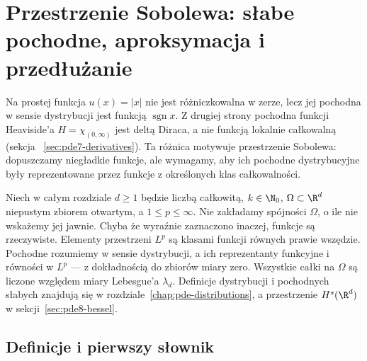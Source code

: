 \chapter[Przestrzenie Sobolewa]{Przestrzenie Sobolewa: słabe pochodne, aproksymacja i przedłużanie}
\label{chap:pde-sobolev}

Na prostej funkcja $u(x)=|x|$ nie jest różniczkowalna w zerze,
lecz jej pochodna w sensie dystrybucji jest funkcją
$\operatorname{sgn}x$. Z drugiej strony pochodna funkcji
Heaviside'a $H=\chi_{(0,\infty)}$ jest deltą Diraca,
a nie funkcją lokalnie całkowalną (sekcja
~\ref{sec:pde7-derivatives}). Ta różnica motywuje przestrzenie Sobolewa: dopuszczamy
niegładkie funkcje, ale wymagamy, aby ich pochodne dystrybucyjne
były reprezentowane przez funkcje z określonych klas całkowalności.

Niech w całym rozdziale $d\ge1$ będzie liczbą
całkowitą, $k\in\N_0$, $\Omega\subset\R^d$ niepustym zbiorem
otwartym, a $1\le p\le\infty$. Nie zakładamy spójności $\Omega$,
o ile nie wskażemy jej jawnie. Chyba że wyraźnie zaznaczono
inaczej, funkcje są rzeczywiste. Elementy przestrzeni $L^p$
są klasami funkcji równych prawie wszędzie. Pochodne rozumiemy
w sensie dystrybucji, a ich reprezentanty funkcyjne i równości
w $L^p$ — z dokładnością do zbiorów miary zero. Wszystkie całki na $\Omega$ są liczone
względem miary Lebesgue'a $\lambda_d$. Definicje dystrybucji i
pochodnych słabych znajdują się w rozdziale~\ref{chap:pde-distributions},
a przestrzenie $H^s(\R^d)$ w sekcji~\ref{sec:pde8-bessel}.

\section{Definicje i pierwszy słownik}
\label{sec:pde9-def}

